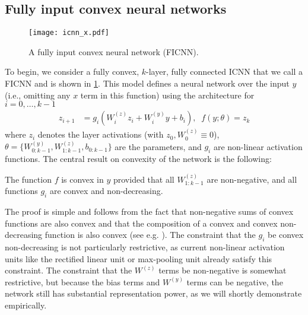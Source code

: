 \subsection{Fully input convex neural networks}

\begin{figure}[t]
  \centering
  \texttt{[image: icnn\_x.pdf]}
  \caption{A fully input convex neural network (FICNN).}
  \label{fig:ficnn}
\end{figure}

To begin, we consider a fully convex, $k$-layer, fully connected ICNN
that we call a FICNN and is shown in \cref{fig:ficnn}.
This model defines a neural network over the input $y$
(i.e., omitting any $x$ term in this function) using the architecture for
$i=0,\ldots,k-1$
\begin{equation}
\begin{split}
\label{eq-ficnn}
z_{i+1} & = g_i\left(W^{(z)}_i z_i + W^{(y)}_i y + b_i \right ), \;\; f
(y;\theta) = z_k
\end{split}
\end{equation}
where $z_i$ denotes the layer activations (with $z_0, W^{(z)}_0 \equiv 0$),
$\theta = \{W^ {(y)}_{0:k-1}, W^{(z)}_{1:k-1}, b_{0:k-1}\}$ are the
parameters, and $g_i$ are non-linear activation functions.  The central result
on convexity of the network is the following:
\begin{proposition}\label{prop-convex}
The function $f$ is convex in $y$ provided that all
$W^{(z)}_{1:k-1}$ are non-negative, and all functions $g_i$ are convex and
non-decreasing.
\end{proposition}
The proof is simple and follows from the fact that
non-negative sums of convex functions are also convex and that the composition
of a convex and convex non-decreasing function is also convex
(see e.g. \citet[3.2.4]{boyd2004convex}).
The constraint that the $g_i$ be convex
non-decreasing is not particularly restrictive, as current non-linear activation
units like the rectified linear unit or max-pooling unit already satisfy this
constraint.  The constraint that the $W^{(z)}$ terms be non-negative is
somewhat restrictive, but because the bias terms and $W^{(y)}$ terms can be
negative, the network still has substantial representation power, as we will
shortly demonstrate empirically.

